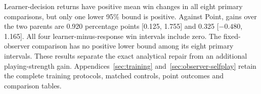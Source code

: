 Learner-decision returns have positive mean win changes in all eight primary
comparisons, but only one lower 95\% bound is positive. Against Point, gains
over the two parents are 0.920 percentage points [0.125, 1.755] and 0.325
[$-0.480$, 1.165]. All four learner-minus-response win intervals include zero.
The fixed-observer comparison has no positive lower bound among its eight
primary intervals. These results separate the exact analytical repair from
an additional playing-strength gain. Appendices~\ref{sec:training}
and~\ref{sec:observer-selfplay} retain the complete training protocols,
matched controls, point outcomes and comparison tables.

